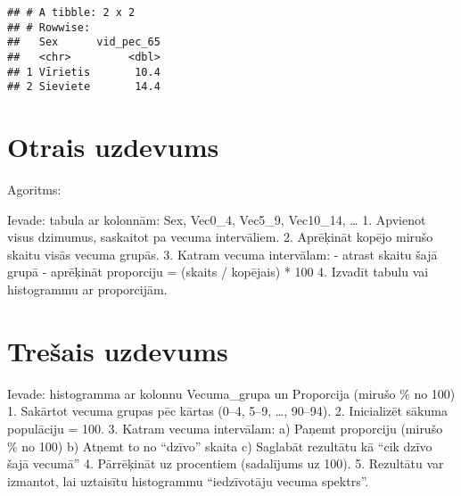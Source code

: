 \documentclass[
]{article}
\begin{document}
\begin{verbatim}
## # A tibble: 2 x 2
## # Rowwise: 
##   Sex      vid_pec_65
##   <chr>         <dbl>
## 1 Vīrietis       10.4
## 2 Sieviete       14.4
\end{verbatim}

\section{Otrais uzdevums}\label{otrais-uzdevums}

Agoritms:

Ievade: tabula ar kolonnām: Sex, Vec0\_4, Vec5\_9, Vec10\_14, \ldots{}
1. Apvienot visus dzimumus, saskaitot pa vecuma intervāliem. 2.
Aprēķināt kopējo mirušo skaitu visās vecuma grupās. 3. Katram vecuma
intervālam: - atrast skaitu šajā grupā - aprēķināt proporciju = (skaits
/ kopējais) * 100 4. Izvadīt tabulu vai histogrammu ar proporcijām.

\section{Trešais uzdevums}\label{treux161ais-uzdevums}

Ievade: histogramma ar kolonnu Vecuma\_grupa un Proporcija (mirušo \% no
100) 1. Sakārtot vecuma grupas pēc kārtas (0--4, 5--9, \ldots, 90--94).
2. Inicializēt sākuma populāciju = 100. 3. Katram vecuma intervālam: a)
Paņemt proporciju (mirušo \% no 100) b) Atņemt to no ``dzīvo'' skaita c)
Saglabāt rezultātu kā ``cik dzīvo šajā vecumā'' 4. Pārrēķināt uz
procentiem (sadalījums uz 100). 5. Rezultātu var izmantot, lai uztaisītu
histogrammu ``iedzīvotāju vecuma spektrs''.
\end{document}
